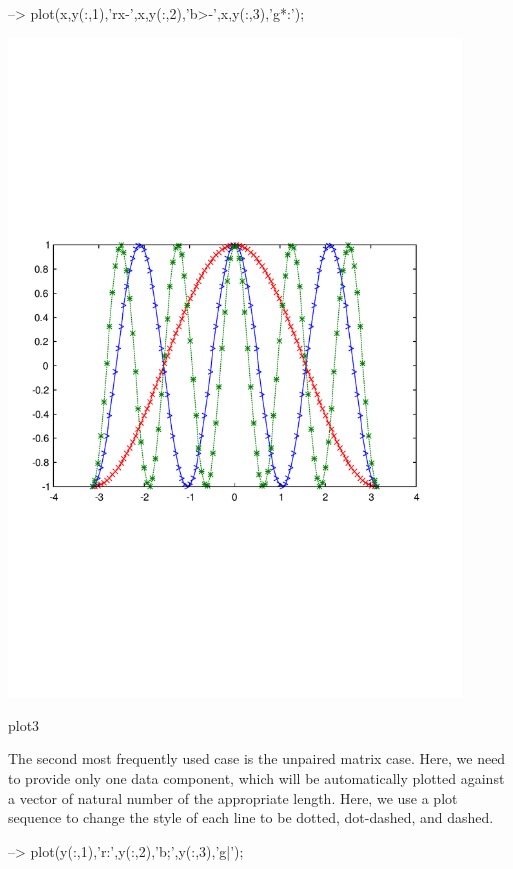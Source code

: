 \begin{DoxyVerbInclude}
--> plot(x,y(:,1),'rx-',x,y(:,2),'b>-',x,y(:,3),'g*:');
\end{DoxyVerbInclude}


 
\begin{DoxyImage}
\includegraphics[width=12cm]{plot3}
\caption{plot3}
\end{DoxyImage}


The second most frequently used case is the unpaired matrix case. Here, we need to provide only one data component, which will be automatically plotted against a vector of natural number of the appropriate length. Here, we use a plot sequence to change the style of each line to be dotted, dot-\/dashed, and dashed.


\begin{DoxyVerbInclude}
--> plot(y(:,1),'r:',y(:,2),'b;',y(:,3),'g|');
\end{DoxyVerbInclude}


